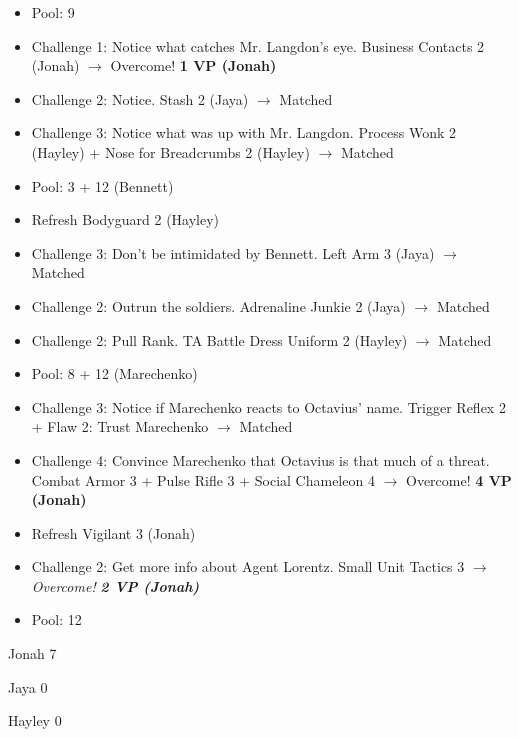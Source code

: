 \begin{itemize}[noitemsep,topsep=0pt]
\item Pool: 9
\item Challenge 1:  Notice what catches Mr. Langdon's eye. Business Contacts 2 (Jonah) $\rightarrow$ Overcome! \textbf{1 VP (Jonah)}
\item Challenge 2:  Notice.  Stash 2 (Jaya) $\rightarrow$ Matched
\item Challenge 3: Notice what was up with Mr. Langdon.  Process Wonk 2 (Hayley) + Nose for Breadcrumbs 2 (Hayley) $\rightarrow$ Matched
\item Pool: 3 + 12 (Bennett)
\item Refresh Bodyguard 2 (Hayley)
\item Challenge 3: Don't be intimidated by Bennett.   Left Arm 3 (Jaya) $\rightarrow$ Matched
\item Challenge 2: Outrun the soldiers.  Adrenaline Junkie 2 (Jaya) $\rightarrow$ Matched
\item Challenge 2: Pull Rank.   TA Battle Dress Uniform 2 (Hayley) $\rightarrow$ Matched
\item Pool: 8 + 12 (Marechenko)
\item Challenge 3: Notice if Marechenko reacts to Octavius' name.  Trigger Reflex 2 +  {\color[RGB]{255,0,0}Flaw 2: Trust Marechenko}  $\rightarrow$ Matched
\item Challenge 4: Convince Marechenko that Octavius is that much of a threat.  Combat Armor 3 + Pulse Rifle 3 + Social Chameleon 4 $\rightarrow$ Overcome! \textbf{4 VP (Jonah)}
\item Refresh Vigilant 3 (Jonah)
\item Challenge 2: Get more info about Agent Lorentz.  Small Unit Tactics 3 \textit{$\rightarrow$ Overcome! }\textit{\textbf{2 VP (Jonah)}}
\item Pool: 12
\end{itemize}





Jonah 7

Jaya 0

Hayley 0





